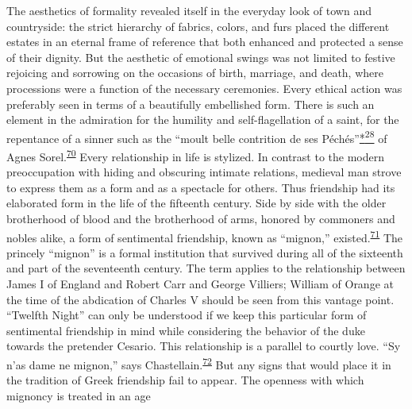 The aesthetics of formality revealed itself in the everyday look of town
and countryside: the strict hierarchy of fabrics, colors, and furs
placed the different estates in an eternal frame of reference that both
enhanced and protected a sense of their dignity. But the aesthetic of
emotional swings was not limited to festive rejoicing and sorrowing on
the occasions of birth, marriage, and death, where processions were a
function of the necessary ceremonies. Every ethical action was
preferably seen in terms of a beautifully embellished form. There is
such an element in the admiration for the humility and self-flagellation
of a saint, for the repentance of a sinner such as the ``moult belle
contrition de ses
Péchés''\protect\hypertarget{09_Chapter_Two__THE_CRAVING_FOR_A_M.xhtmlux5cux23id_2463}{\protect\hyperlink{23_NOTES.xhtmlux5cux23id_2464}{*\textsuperscript{28}}}
of Agnes
Sorel.\textsuperscript{\protect\hypertarget{09_Chapter_Two__THE_CRAVING_FOR_A_M.xhtmlux5cux23id_1949}{\protect\hyperlink{23_NOTES.xhtmlux5cux23id_1950}{70}}}
Every relationship in life is stylized. In contrast to the modern
preoccupation with hiding and obscuring intimate relations, medieval man
strove to express them as a form and as a spectacle for others. Thus
friendship had its elaborated form in the life of the fifteenth century.
Side by side with the older brotherhood of blood and the brotherhood of
arms, honored by commoners and nobles alike, a form of sentimental
friendship, known as ``mignon,''
existed.\textsuperscript{\protect\hypertarget{09_Chapter_Two__THE_CRAVING_FOR_A_M.xhtmlux5cux23id_1947}{\protect\hyperlink{23_NOTES.xhtmlux5cux23id_1948}{71}}}
The princely ``mignon'' is a formal institution that survived during all
of the sixteenth and part of the seventeenth century. The term applies
to the relationship between James I of England and Robert Carr and
George Villiers; William of Orange
\protect\hypertarget{09_Chapter_Two__THE_CRAVING_FOR_A_M.xhtmlux5cux23page_59}{}{}at
the time of the abdication of Charles V should be seen from this vantage
point. ``Twelfth Night'' can only be understood if we keep this
particular form of sentimental friendship in mind while considering the
behavior of the duke towards the pretender Cesario. This relationship is
a parallel to courtly love. ``Sy n'as dame ne mignon,'' says
Chastellain.\textsuperscript{\protect\hypertarget{09_Chapter_Two__THE_CRAVING_FOR_A_M.xhtmlux5cux23id_1945}{\protect\hyperlink{23_NOTES.xhtmlux5cux23id_1946}{72}}}
But any signs that would place it in the tradition of Greek friendship
fail to appear. The openness with which mignoncy is treated in an age
